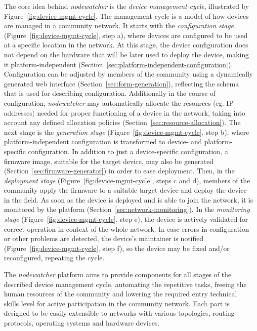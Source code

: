 \documentclass[5p,sort&compress]{elsarticle}
\newcommand{\nodewatcher}{\textit{nodewatcher}}
\begin{document}
The core idea behind \nodewatcher{} is the \textit{device management cycle}, illustrated by Figure~\ref{fig:device-mgmt-cycle}.
The management cycle is a model of how devices are managed in a community network.
It starts with the \textit{configuration stage} (Figure~\ref{fig:device-mgmt-cycle}, step a), where devices are configured to be used at a specific location in the network.
At this stage, the device configuration does not depend on the hardware that will be later used to deploy the device, making it platform-independent (Section~\ref{sec:platform-independent-configuration}).
Configuration can be adjusted by members of the community using a dynamically generated web interface (Section~\ref{sec:form-generation}), reflecting the schema that is used for describing configuration.
Additionally in the course of configuration, \nodewatcher{} may automatically allocate the resources (eg. IP addresses) needed for proper functioning of a device in the network, taking into account any defined allocation policies (Section~\ref{sec:resource-allocation}).
The next stage is the \textit{generation stage} (Figure~\ref{fig:device-mgmt-cycle}, step b), where platform-independent configuration is transformed to device- and platform-specific configuration.
In addition to just a device-specific configuration, a firmware image, suitable for the target device, may also be generated (Section~\ref{sec:firmware-generator}) in order to ease deployment.
Then, in the \textit{deployment stage} (Figure~\ref{fig:device-mgmt-cycle}, steps c and d), members of the community apply the firmware to a suitable target device and deploy the device in the field.
As soon as the device is deployed and is able to join the network, it is monitored by the platform (Section~\ref{sec:network-monitoring}).
In the \textit{monitoring stage} (Figure~\ref{fig:device-mgmt-cycle}, step e), the device is actively validated for correct operation in context of the whole network.
In case errors in configuration or other problems are detected, the device's maintainer is notified (Figure~\ref{fig:device-mgmt-cycle}, step f), so the device may be fixed and/or reconfigured, repeating the cycle.

The \nodewatcher{} platform aims to provide components for all stages of the described device management cycle, automating the repetitive tasks, freeing the human resources of the community and lowering the required entry technical skills level for active participation in the community network.  
Each part is designed to be easily extensible to networks with various topologies, routing protocols, operating systems and hardware devices.
\end{document}
